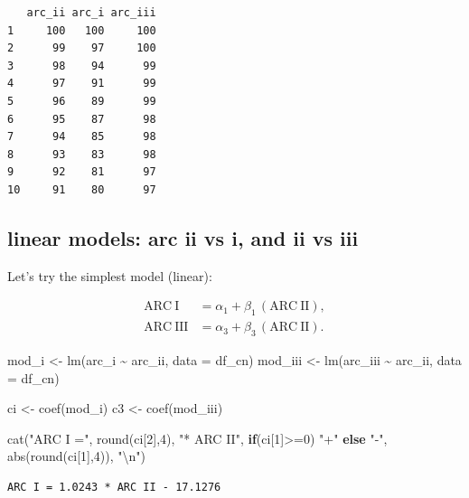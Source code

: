 \documentclass[
  letterpaper,
  DIV=11,
  numbers=noendperiod]{scrartcl}
\newenvironment{Shaded}{\begin{snugshade}}{\end{snugshade}}
\newcommand{\AttributeTok}[1]{\textcolor[rgb]{0.40,0.45,0.13}{#1}}
\newcommand{\ControlFlowTok}[1]{\textcolor[rgb]{0.00,0.23,0.31}{\textbf{#1}}}
\newcommand{\DecValTok}[1]{\textcolor[rgb]{0.68,0.00,0.00}{#1}}
\newcommand{\FunctionTok}[1]{\textcolor[rgb]{0.28,0.35,0.67}{#1}}
\newcommand{\NormalTok}[1]{\textcolor[rgb]{0.00,0.23,0.31}{#1}}
\newcommand{\OtherTok}[1]{\textcolor[rgb]{0.00,0.23,0.31}{#1}}
\newcommand{\SpecialCharTok}[1]{\textcolor[rgb]{0.37,0.37,0.37}{#1}}
\newcommand{\StringTok}[1]{\textcolor[rgb]{0.13,0.47,0.30}{#1}}
\begin{document}
\begin{verbatim}
   arc_ii arc_i arc_iii
1     100   100     100
2      99    97     100
3      98    94      99
4      97    91      99
5      96    89      99
6      95    87      98
7      94    85      98
8      93    83      98
9      92    81      97
10     91    80      97
\end{verbatim}

\subsection{linear models: arc ii vs i, and ii vs
iii}\label{linear-models-arc-ii-vs-i-and-ii-vs-iii}

Let's try the simplest model (linear):

\[
\begin{aligned}
\mathrm{ARC\ I}   &= \alpha_{1} + \beta_{1}\,(\mathrm{ARC\ II}), \\
\mathrm{ARC\ III} &= \alpha_{3} + \beta_{3}\,(\mathrm{ARC\ II}).
\end{aligned}
\]

\begin{Shaded}
\begin{Highlighting}[]
\NormalTok{mod\_i   }\OtherTok{\textless{}{-}} \FunctionTok{lm}\NormalTok{(arc\_i   }\SpecialCharTok{\textasciitilde{}}\NormalTok{ arc\_ii,  }\AttributeTok{data =}\NormalTok{ df\_cn)}
\NormalTok{mod\_iii }\OtherTok{\textless{}{-}} \FunctionTok{lm}\NormalTok{(arc\_iii }\SpecialCharTok{\textasciitilde{}}\NormalTok{ arc\_ii,  }\AttributeTok{data =}\NormalTok{ df\_cn)}

\NormalTok{ci }\OtherTok{\textless{}{-}} \FunctionTok{coef}\NormalTok{(mod\_i)}
\NormalTok{c3 }\OtherTok{\textless{}{-}} \FunctionTok{coef}\NormalTok{(mod\_iii)}

\FunctionTok{cat}\NormalTok{(}\StringTok{"ARC I ="}\NormalTok{, }\FunctionTok{round}\NormalTok{(ci[}\DecValTok{2}\NormalTok{],}\DecValTok{4}\NormalTok{), }\StringTok{"* ARC II"}\NormalTok{, }\ControlFlowTok{if}\NormalTok{(ci[}\DecValTok{1}\NormalTok{]}\SpecialCharTok{\textgreater{}=}\DecValTok{0}\NormalTok{) }\StringTok{"+"} \ControlFlowTok{else} \StringTok{"{-}"}\NormalTok{, }\FunctionTok{abs}\NormalTok{(}\FunctionTok{round}\NormalTok{(ci[}\DecValTok{1}\NormalTok{],}\DecValTok{4}\NormalTok{)), }\StringTok{"}\SpecialCharTok{\textbackslash{}n}\StringTok{"}\NormalTok{)}
\end{Highlighting}
\end{Shaded}

\begin{verbatim}
ARC I = 1.0243 * ARC II - 17.1276 
\end{verbatim}
\end{document}
